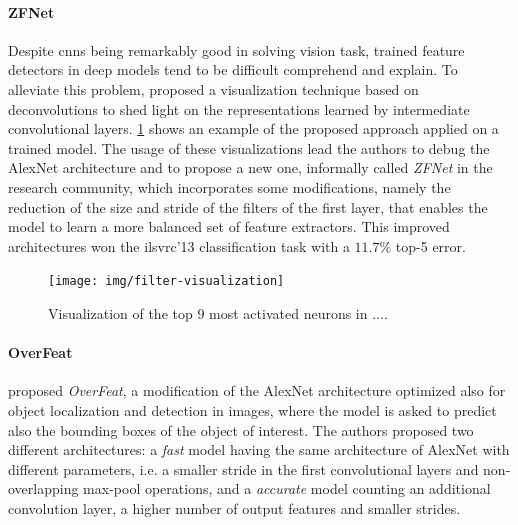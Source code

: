 \paragraph{ZFNet} Despite \glspl{cnn} being remarkably good in solving vision task,
trained feature detectors in deep models tend to be difficult comprehend and explain.
To alleviate this problem, \citet{zeiler2014visualizing} proposed a visualization technique based on deconvolutions to shed light on the representations learned by intermediate convolutional layers.
\ref{fig:back:filter-visualization} shows an example of the proposed approach applied on a trained model.
The usage of these visualizations lead the authors to debug the AlexNet architecture and to propose a new one, informally called \emph{ZFNet} in the research community, which incorporates some modifications, namely the reduction of the size and stride of the filters of the first layer, that enables the model to learn a more balanced set of feature extractors.
This improved architectures won the \gls{ilsvrc}'13 classification task with a $11.7 \%$ top-5 error.

\begin{figure}
    \centering
    \texttt{[image: img/filter-visualization]}
    \caption{Visualization of the top 9 most activated neurons in ....}
    \label{fig:back:filter-visualization}
\end{figure}

\paragraph{OverFeat} \citet{sermanet2013overfeat} proposed \emph{OverFeat}, a modification of the AlexNet architecture optimized also for object localization and detection in images, where the model is asked to predict also the bounding boxes of the object of interest.
The authors proposed two different architectures: a \emph{fast} model having the same architecture of AlexNet with different parameters, i.e. a smaller stride in the first convolutional layers and non-overlapping max-pool operations, and a \emph{accurate} model counting an additional convolution layer, a higher number of output features and smaller strides.

